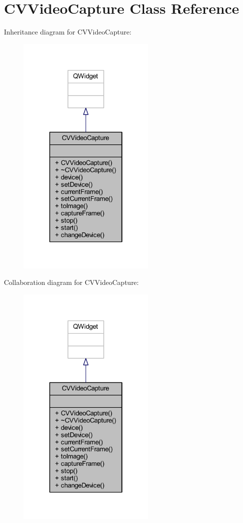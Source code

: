 \hypertarget{class_c_v_video_capture}{}\section{C\+V\+Video\+Capture Class Reference}
\label{class_c_v_video_capture}


Inheritance diagram for C\+V\+Video\+Capture\+:\nopagebreak
\begin{figure}[H]
\begin{center}
\leavevmode
\includegraphics[width=190pt]{d9/dbd/class_c_v_video_capture__inherit__graph}
\end{center}
\end{figure}


Collaboration diagram for C\+V\+Video\+Capture\+:\nopagebreak
\begin{figure}[H]
\begin{center}
\leavevmode
\includegraphics[width=190pt]{d3/d5e/class_c_v_video_capture__coll__graph}
\end{center}
\end{figure}
